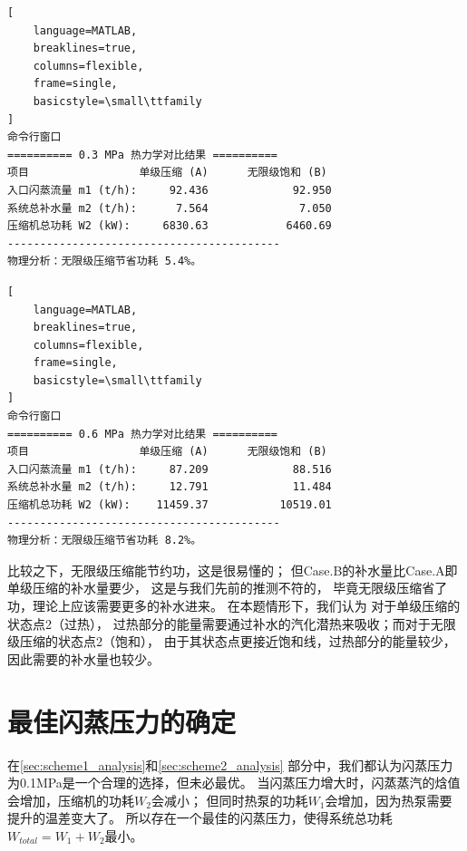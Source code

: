 \documentclass{thuemp}
\begin{document}
\begin{lstlisting}[
    language=MATLAB,
    breaklines=true,
    columns=flexible,
    frame=single,
    basicstyle=\small\ttfamily
]
命令行窗口
========== 0.3 MPa 热力学对比结果 ==========
项目                 单级压缩 (A)      无限级饱和 (B)
入口闪蒸流量 m1 (t/h):     92.436             92.950
系统总补水量 m2 (t/h):      7.564              7.050
压缩机总功耗 W2 (kW):     6830.63            6460.69
------------------------------------------
物理分析：无限级压缩节省功耗 5.4%。
\end{lstlisting}

\begin{lstlisting}[
    language=MATLAB,
    breaklines=true,
    columns=flexible,
    frame=single,
    basicstyle=\small\ttfamily
]
命令行窗口
========== 0.6 MPa 热力学对比结果 ==========
项目                 单级压缩 (A)      无限级饱和 (B)
入口闪蒸流量 m1 (t/h):     87.209             88.516
系统总补水量 m2 (t/h):     12.791             11.484
压缩机总功耗 W2 (kW):    11459.37           10519.01
------------------------------------------
物理分析：无限级压缩节省功耗 8.2%。
\end{lstlisting}

比较之下，无限级压缩能节约功，这是很易懂的；
但Case.B的补水量比Case.A即单级压缩的补水量要少，
这是与我们先前的推测不符的，
毕竟无限级压缩省了功，理论上应该需要更多的补水进来。
在本题情形下，我们认为
对于单级压缩的状态点2（过热），
过热部分的能量需要通过补水的汽化潜热来吸收；而对于无限级压缩的状态点2（饱和），
由于其状态点更接近饱和线，过热部分的能量较少，因此需要的补水量也较少。









\section{最佳闪蒸压力的确定}


在\ref{sec:scheme1_analysis}和\ref{sec:scheme2_analysis}
部分中，我们都认为闪蒸压力为0.1MPa是一个合理的选择，但未必最优。
当闪蒸压力增大时，闪蒸蒸汽的焓值会增加，压缩机的功耗$W_2$会减小；
但同时热泵的功耗$W_1$会增加，因为热泵需要提升的温差变大了。
所以存在一个最佳的闪蒸压力，使得系统总功耗$W_{total}=W_1+W_2$最小。
\end{document}
